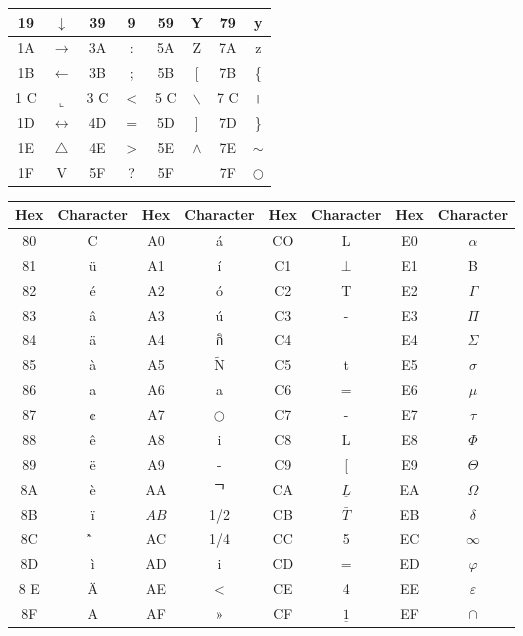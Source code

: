 \documentclass[10pt]{book}
\begin{document}
\begin{center}
\begin{center}
\begin{center}
\begin{center}
\begin{center}
\begin{center}
\begin{tabular}{|c|c|c|c|c|c|c|c|}
\hline
19 & $\downarrow$ & 39 & 9 & 59 & Y & 79 & y \\
\hline
1A & $\rightarrow$ & 3A & : & 5A & Z & 7A & z \\
\hline
1B & $\leftarrow$ & 3B & ; & 5B & [ & 7B & \{ \\
\hline
1 C & $\llcorner$ & 3 C & < & 5 C & $\backslash$ & 7 C & । \\
\hline
1D & $\leftrightarrow$ & 4D & $=$ & 5D & ] & 7D & \} \\
\hline
1E & $\triangle$ & 4E & > & 5E & $\wedge$ & 7E & $\sim$ \\
\hline
1F & V & 5F & ? & 5F &  & 7F & $\bigcirc$ \\
\hline
\end{tabular}
\end{center}

\begin{center}
\begin{tabular}{|c|c|c|c|c|c|c|c|}
\hline
Hex & Character & Hex & Character & Hex & Character & Hex & Character \\
\hline
80 & C & A0 & á & CO & L & E0 & $\alpha$ \\
\hline
81 & ü & A1 & í & C1 & $\perp$ & E1 & B \\
\hline
82 & é & A2 & ó & C2 & T & E2 & $\Gamma$ \\
\hline
83 & â & A3 & ú & C3 & - & E3 & $\Pi$ \\
\hline
84 & ä & A4 & กิ & C4 &  & E4 & $\Sigma$ \\
\hline
85 & à & A5 & $\tilde{\mathrm{N}}$ & C5 & t & E5 & $\sigma$ \\
\hline
86 & a & A6 & a & C6 & $=$ & E6 & $\mu$ \\
\hline
87 & ¢ & A7 & $\bigcirc$ & C7 & - & E7 & $\tau$ \\
\hline
88 & ê & A8 & i & C8 & L & E8 & $\Phi$ \\
\hline
89 & ë & A9 & - & C9 & [ & E9 & $\Theta$ \\
\hline
8A & è & AA & ᄀ & CA & $\underline{L}$ & EA & $\Omega$ \\
\hline
8B & ï & $A B$ & 1/2 & CB & $\bar{T}$ & EB & $\delta$ \\
\hline
8C & ̂̀ & AC & 1/4 & CC & 5 & EC & $\infty$ \\
\hline
8D & ì & AD & i & CD & $=$ & ED & $\varphi$ \\
\hline
8 E & Ä & AE & < & CE & 4 & EE & $\varepsilon$ \\
\hline
8F & A & AF & » & CF & $\underline{1}$ & EF & $\cap$ \\

\end{tabular}
\end{center}
\end{center}
\end{center}
\end{center}
\end{center}
\end{center}
\end{document}
